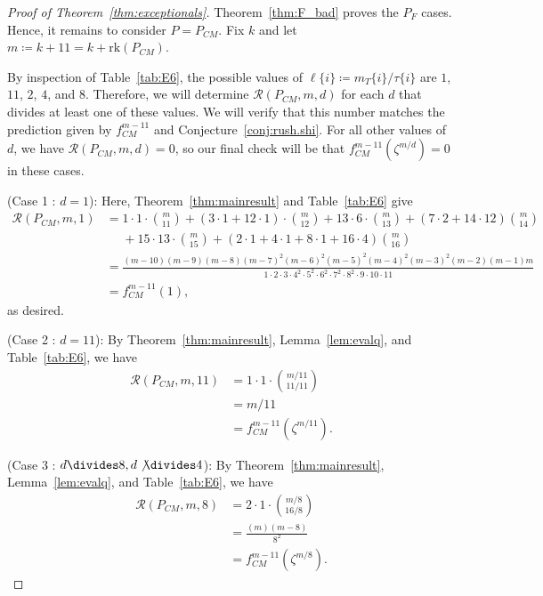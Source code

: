 \documentclass[12pt]{amsart}
\theoremstyle{definition}
\theoremstyle{remark}
\numberwithin{equation}{section}
\newcommand{\rank}{\ensuremath{\mathrm{rk}}}
\begin{document}
\begin{proof}[Proof of Theorem~\ref{thm:exceptionals}]
Theorem~\ref{thm:F_bad} proves the $P_F$ cases. Hence, it remains to consider $P = P_{CM}$.
Fix $k$ and let $m \coloneqq k +11   = k + \rank(P_{CM})$. 

By inspection of Table~\ref{tab:E6}, the possible values of $\ell\{i\} \coloneqq m_T\{i\}/\tau\{i\}$ are $1$, $11$, $2$, $4$, and $8$. Therefore, we will determine $\mathcal{R}(P_{CM},m,d)$ for each $d$ that divides at least one of these values. We will verify that this number matches the prediction given by $f^{m-11}_{CM}$ and Conjecture~\ref{conj:rush.shi}. For all other values of $d$, we have $\mathcal{R}(P_{CM},m,d) = 0$, so our final check will be that  $f^{m-11}_{CM}(\zeta^{m/d}) = 0$ in these cases.

\smallskip

\noindent
{\sf (Case 1 : $d = 1$)}:
Here, Theorem~\ref{thm:mainresult} and Table~\ref{tab:E6} give
\tiny
\begin{align*}
\mathcal{R}(P_{CM},m,1) &= 1 \cdot 1 \cdot \binom{m}{11} + (3 \cdot 1  + 12 \cdot 1)  \cdot \binom{m}{12} + 13 \cdot 6 \cdot \binom{m}{13} + (7\cdot 2 + 14 \cdot 12) \binom{m}{14}  \\ &\ \ \ \ \ \ + 15 \cdot 13 \cdot \binom{m}{15} + (2 \cdot 1 + 4 \cdot 1 + 8 \cdot 1 + 16 \cdot 4) \binom{m}{16} \\
&= \frac{(m-10)(m-9)(m-8)(m-7)^2(m-6)^2(m-5)^2(m-4)^2(m-3)^2(m-2)(m-1)m}{1\cdot 2\cdot 3\cdot 4^2 \cdot 5^2 \cdot 6^2 \cdot 7^2 \cdot 8^2 \cdot 9 \cdot 10 \cdot 11} \\
&= f_{CM}^{m-11}(1),
\end{align*}
\normalsize
as desired.

\smallskip
\noindent
{\sf (Case 2 : $d = 11$)}:
By Theorem~\ref{thm:mainresult}, Lemma~\ref{lem:evalq}, and Table~\ref{tab:E6}, we have
\begin{align*}
\mathcal{R}(P_{CM},m,11) &= 1 \cdot 1 \cdot \binom{m/11}{11/11} \\
&= m/11 \\ 
&= f_{CM}^{m-11}(\zeta^{m/11}).
\end{align*}

\smallskip
\noindent
{\sf (Case 3 : $d \divides 8, d \not \divides 4$)}:
By Theorem~\ref{thm:mainresult}, Lemma~\ref{lem:evalq}, and Table~\ref{tab:E6}, we have
\begin{align*}
\mathcal{R}(P_{CM},m,8) &= 2 \cdot 1 \cdot \binom{m/8}{16/8} \\
&= \frac{(m)(m-8)}{8^2} \\
&= f_{CM}^{m-11}(\zeta^{m/8}).
\end{align*}


\end{proof}
\end{document}
